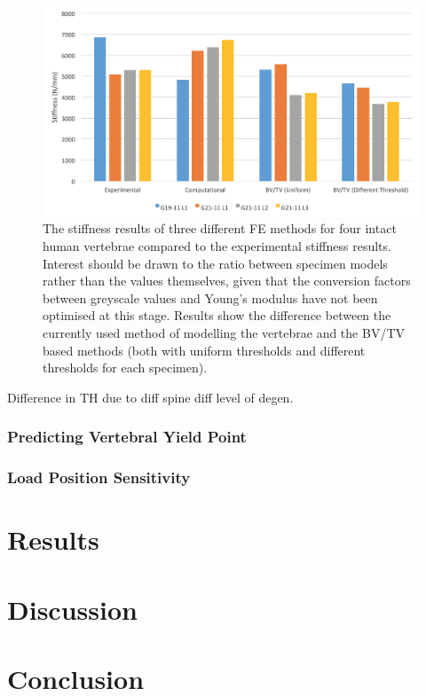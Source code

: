\begin{figure}[ht]
\centering
\includegraphics[width=6in]{Chapters/Chapter_HT_images/diffModellingMethods.png}
\caption{The stiffness results of three different FE methods for four intact human vertebrae compared to the experimental stiffness results.
	Interest should be drawn to the ratio between specimen models rather than the values themselves, given that the conversion factors between greyscale values and Young's modulus have not been optimised at this stage.
Results show the difference between the currently used method of modelling the vertebrae and the BV/TV based methods (both with uniform thresholds and different thresholds for each specimen).}
\label{fig:diffModellingMethods}
\end{figure}


Difference in TH due to diff spine diff level of degen.


\subsubsection{Predicting Vertebral Yield Point}\label{predYield}

\subsubsection{Load Position Sensitivity}

\section{Results}

\section{Discussion}

\section{Conclusion}







